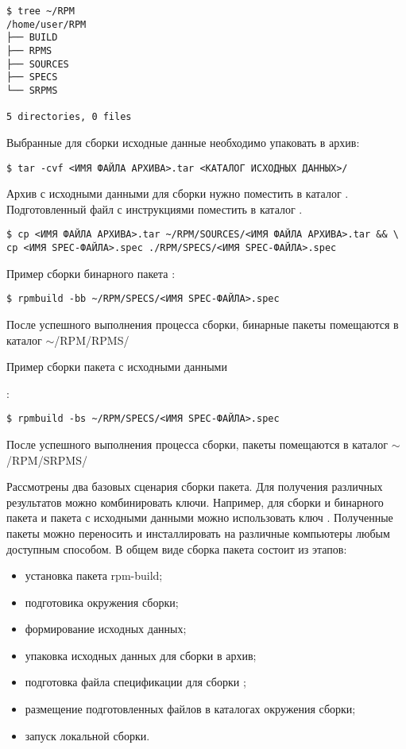 \begin{verbatim}
$ tree ~/RPM
/home/user/RPM
├── BUILD
├── RPMS
├── SOURCES
├── SPECS
└── SRPMS

5 directories, 0 files
\end{verbatim}

Выбранные для сборки исходные данные необходимо упаковать в  архив:

\begin{verbatim}
$ tar -cvf <ИМЯ ФАЙЛА АРХИВА>.tar <КАТАЛОГ ИСХОДНЫХ ДАННЫХ>/
\end{verbatim}

Архив с исходными данными для сборки нужно поместить в каталог .
Подготовленный  файл с инструкциями поместить в каталог .

\begin{verbatim}
$ cp <ИМЯ ФАЙЛА АРХИВА>.tar ~/RPM/SOURCES/<ИМЯ ФАЙЛА АРХИВА>.tar && \
cp <ИМЯ SPEC-ФАЙЛА>.spec ./RPM/SPECS/<ИМЯ SPEC-ФАЙЛА>.spec
\end{verbatim}

Пример сборки бинарного пакета :
\begin{verbatim}
$ rpmbuild -bb ~/RPM/SPECS/<ИМЯ SPEC-ФАЙЛА>.spec
\end{verbatim}
После успешного выполнения процесса сборки, бинарные пакеты  помещаются в каталог $\sim$/RPM/RPMS/

\hypertarget{rpmbuild-exampl-src}{Пример сборки пакета с исходными данными }:
\begin{verbatim}
$ rpmbuild -bs ~/RPM/SPECS/<ИМЯ SPEC-ФАЙЛА>.spec
\end{verbatim}
После успешного выполнения процесса сборки, пакеты  помещаются в каталог $\sim$/RPM/SRPMS/

Рассмотрены два базовых сценария сборки пакета. Для получения различных результатов можно комбинировать ключи.
Например, для сборки и бинарного пакета и пакета с исходными данными можно использовать ключ \Sys{-ba}.
Полученные пакеты можно переносить и инсталлировать на различные компьютеры любым доступным способом.
В общем виде сборка пакета состоит из этапов:
\begin{itemize}
\item установка пакета rpm-build;
\item подготовика окружения сборки;
\item формирование исходных данных;
\item упаковка исходных данных для сборки в  архив;
\item подготовка файла спецификации для сборки ;
\item размещение подготовленных файлов в каталогах окружения сборки;
\item запуск локальной сборки.
\end{itemize}


